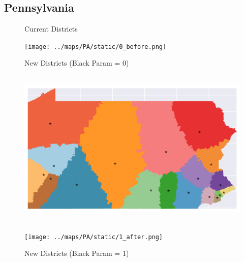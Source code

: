 \subsection{Pennsylvania}
\begin{figure}[htb!] \centering
\caption{ Current Districts }
\texttt{[image: ../maps/PA/static/0\_before.png]}
\caption{ New Districts (Black Param = 0) }
\includegraphics[width=5in,height=3in,keepaspectratio]{../maps/PA/static/0_after.png}
\caption{ New Districts (Black Param = 1) }
\texttt{[image: ../maps/PA/static/1\_after.png]}
\end{figure}

\clearpage
\newpage


